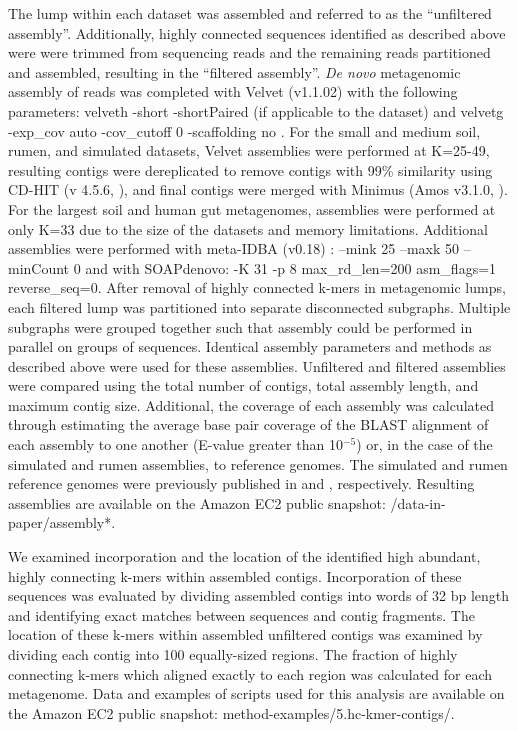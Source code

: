 \documentclass[10pt]{article}
\begin{document}
The lump within each dataset was assembled and referred to as the
``unfiltered assembly''.  Additionally, highly connected sequences
identified as described above were were trimmed from sequencing reads
and the remaining reads partitioned and assembled, resulting in the
``filtered assembly''.  \emph{De novo} metagenomic assembly of reads
was completed with Velvet (v1.1.02) with the following parameters:
velveth -short -shortPaired (if applicable to the dataset) and velvetg
-exp\_cov auto -cov\_cutoff 0 -scaffolding no \cite{Zerbino:2008p665}.
For the small and medium soil, rumen, and simulated datasets, Velvet
assemblies were performed at K=25-49, resulting contigs were
dereplicated to remove contigs with 99\% similarity using CD-HIT (v
4.5.6, \cite{Li:2001p1337}), and final contigs were merged with
Minimus (Amos v3.1.0, \cite{Sommer:2007p1253}).  For the largest soil
and human gut metagenomes, assemblies were performed at only K=33 due
to the size of the datasets and memory limitations.  Additional
assemblies were performed with meta-IDBA (v0.18) \cite{Peng:2011p898}
: --mink 25 --maxk 50 --minCount 0 and with SOAPdenovo: -K 31 -p 8
max\_rd\_len=200 asm\_flags=1 reverse\_seq=0.  After removal of highly
connected k-mers in metagenomic lumps, each filtered lump was
partitioned into separate disconnected subgraphs.  Multiple subgraphs
were grouped together such that assembly could be performed in
parallel on groups of sequences.  Identical assembly parameters and
methods as described above were used for these assemblies.  Unfiltered
and filtered assemblies were compared using the total number of
contigs, total assembly length, and maximum contig size.  Additional,
the coverage of each assembly was calculated through estimating the
average base pair coverage of the BLAST alignment of each assembly to
one another (E-value greater than 10$^{-5}$) or, in the case of the
simulated and rumen assemblies, to reference genomes.  The simulated
and rumen reference genomes were previously published in
\cite{Hess:2011p686} and \cite{Pignatelli:2011p742}, respectively.
Resulting assemblies are available on the Amazon EC2 public snapshot:
/data-in-paper/assembly*.

We examined incorporation and the location of the identified high
abundant, highly connecting k-mers within assembled contigs.
Incorporation of these sequences was evaluated by dividing assembled
contigs into words of 32 bp length and identifying exact matches
between sequences and contig fragments.  The location of these k-mers
within assembled unfiltered contigs was examined by dividing each
contig into 100 equally-sized regions.  The fraction of highly
connecting k-mers which aligned exactly to each region was calculated
for each metagenome. Data and examples of scripts used for this
analysis are available on the Amazon EC2 public snapshot:
method-examples/5.hc-kmer-contigs/.
\end{document}
